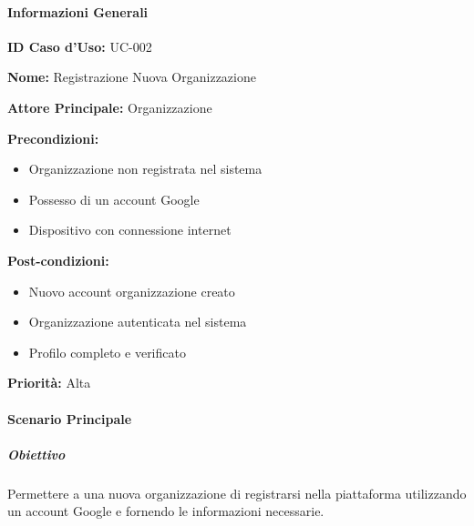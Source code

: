 \paragraph{Informazioni Generali}

\textbf{ID Caso d'Uso:} UC-002

\textbf{Nome:} Registrazione Nuova Organizzazione

\textbf{Attore Principale:} Organizzazione

\textbf{Precondizioni:}
\begin{itemize}
    \item Organizzazione non registrata nel sistema
    \item Possesso di un account Google
    \item Dispositivo con connessione internet
\end{itemize}

\textbf{Post-condizioni:}
\begin{itemize}
    \item Nuovo account organizzazione creato
    \item Organizzazione autenticata nel sistema
    \item Profilo completo e verificato
\end{itemize}

\textbf{Priorità:} Alta

\paragraph{Scenario Principale}

\subparagraph{Obiettivo}
Permettere a una nuova organizzazione di registrarsi nella piattaforma utilizzando un account Google e fornendo le informazioni necessarie.

